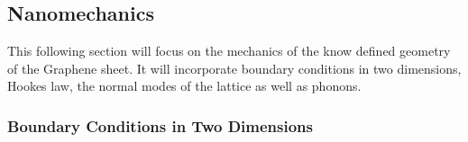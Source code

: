 
\subsection{Nanomechanics}
This following section will focus on the mechanics of the know defined geometry of the Graphene sheet. It will incorporate boundary conditions in two dimensions, Hookes law, the normal modes of the lattice as well as phonons.

\subsubsection{Boundary Conditions in Two Dimensions}
